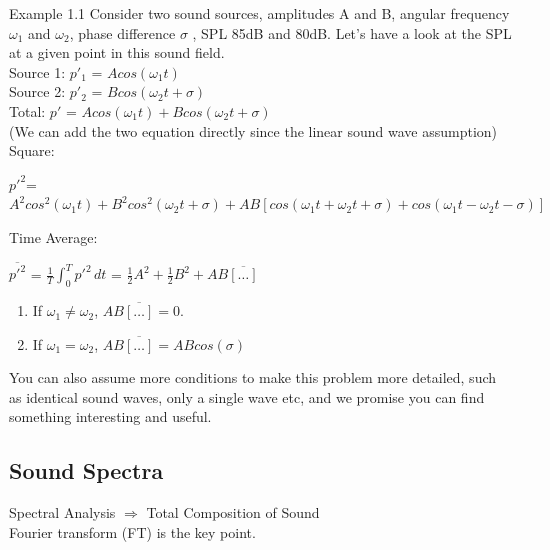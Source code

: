\documentclass[graybox]{svmult}
\begin{document}
\begin{legaltext}{Example 1.1}
\indent 
Consider two sound sources, amplitudes A and B, angular frequency $\omega_1 $ and $\omega_2 $, phase difference $ \sigma $ , SPL 85dB and 80dB. Let's have a look at the SPL at a given point in this sound field. \\

\noindent 
Source 1: $ p'_1 $ = $ Acos(\omega_1t) $ \\
Source 2: $ p'_2 $ = $ Bcos(\omega_2t + \sigma) $ \\
Total: $ p' $ = $ Acos(\omega_1t) + Bcos(\omega_2t + \sigma) $ \\
(We can add the two equation directly since the  linear sound wave assumption) \\

\noindent 
Square:
\begin{center}
$ p'^2 $=$ A^2cos^2(\omega_1t) + B^2cos^2(\omega_2t + \sigma) +AB[cos(\omega_1t+\omega_2t+\sigma) + cos(\omega_1t-\omega_2t-\sigma)] $ \\
\end{center}
Time Average: 
\begin{center}
$ \overline{p'^2} $ = $ \frac{1}{T} \int_{0}^{T}  p'^2\,dt $ = $ \frac{1}{2}A^2 + \frac{1}{2}B^2 + AB\overline{[\dots]}$
\end{center}

\begin{enumerate}
    \item If $ \omega_1 \neq \omega_2 $, $ AB\overline{[\dots]} = 0 $.
    \item If $ \omega_1 = \omega_2 $, $ AB\overline{[\dots]} = ABcos(\sigma) $
\end{enumerate}

You can also assume more conditions to make this problem more detailed, such as identical sound waves, only a single wave etc, and we promise you can find something interesting and useful.
\end{legaltext}

\label{sec:1}
\subsection{Sound Spectra}
\label{subsec:2}
\begin{center}
Spectral Analysis $ \Rightarrow $ Total Composition of Sound \\
Fourier transform (FT) is the key point.
\end{center} 
\end{document}
